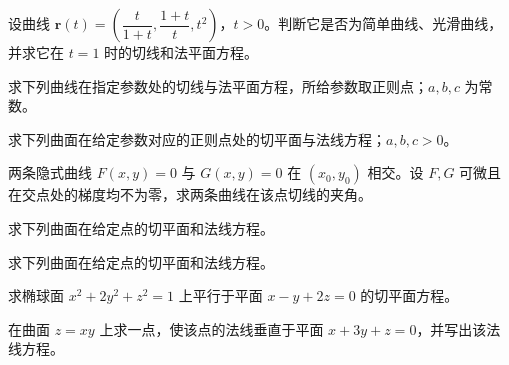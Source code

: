 \noindent\begin{minipage}{\textwidth}
设曲线 $\boldsymbol r(t)=\left(\dfrac{t}{1+t},\dfrac{1+t}{t},t^2\right)$，$t>0$。判断它是否为简单曲线、光滑曲线，并求它在 $t=1$ 时的切线和法平面方程。
\end{minipage}\par\vfill
\noindent\begin{minipage}{\textwidth}
求下列曲线在指定参数处的切线与法平面方程，所给参数取正则点；$a,b,c$ 为常数。
\end{minipage}\par\vfill
\noindent\begin{minipage}{\textwidth}
求下列曲面在给定参数对应的正则点处的切平面与法线方程；$a,b,c>0$。
\end{minipage}\par\vfill
\newpage
\noindent\begin{minipage}{\textwidth}
两条隐式曲线 $F(x,y)=0$ 与 $G(x,y)=0$ 在 $(x_0,y_0)$ 相交。设 $F,G$ 可微且在交点处的梯度均不为零，求两条曲线在该点切线的夹角。
\end{minipage}\par\vfill
\noindent\begin{minipage}{\textwidth}
求下列曲面在给定点的切平面和法线方程。
\end{minipage}\par\vfill
\noindent\begin{minipage}{\textwidth}
求下列曲面在给定点的切平面和法线方程。
\end{minipage}\par\vfill
\noindent\begin{minipage}{\textwidth}
求椭球面 $x^2+2y^2+z^2=1$ 上平行于平面 $x-y+2z=0$ 的切平面方程。
\end{minipage}\par\vfill
\newpage
\noindent\begin{minipage}{\textwidth}
在曲面 $z=xy$ 上求一点，使该点的法线垂直于平面 $x+3y+z=0$，并写出该法线方程。
\end{minipage}\par\vfill
